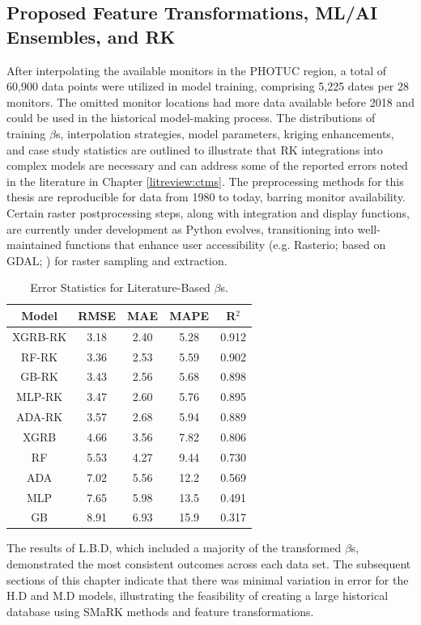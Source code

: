 \subsection{Proposed Feature Transformations, ML/AI Ensembles, and RK} \label{rlts:featsmark} After interpolating the available monitors in the PHOTUC region, a total of 60,900 data points were utilized in model training, comprising 5,225 dates per 28 monitors. The omitted monitor locations had more data available before 2018 and could be used in the historical model-making process. The distributions of training $\beta$s, interpolation strategies, model parameters, kriging enhancements, and case study statistics are outlined to illustrate that RK integrations into complex models are necessary and can address some of the reported errors noted in the literature in Chapter \ref{litreview:ctms}. The preprocessing methods for this thesis are reproducible for data from 1980 to today, barring monitor availability. Certain raster postprocessing steps, along with integration and display functions, are currently under development as Python evolves, transitioning into well-maintained functions that enhance user accessibility (e.g. Rasterio; \cite{gillies_rasterio_2013} based on GDAL; \cite{rouault_gdal_2025}) for raster sampling and extraction. \begin{table}[h!]
    \centering
        \begin{tabular}{||c|cccc||}
            \hline 
            \textbf{Model} & \textbf{RMSE} & \textbf{MAE} & \textbf{MAPE} & \textbf{R$^{2}$} \\
            \hline \hline 
             XGRB-RK & 3.18 & 2.40 &  5.28 & 0.912 \\[3pt]
              RF-RK & 3.36 & 2.53 &  5.59 & 0.902 \\[3pt]
              GB-RK & 3.43 & 2.56 &  5.68 & 0.898 \\[3pt]
             MLP-RK & 3.47 & 2.60 &  5.76 & 0.895 \\[3pt]
             ADA-RK & 3.57 & 2.68 &  5.94 & 0.889 \\[3pt]
               XGRB & 4.66 & 3.56 &  7.82 & 0.806 \\[3pt]
                 RF & 5.53 & 4.27 &  9.44 & 0.730 \\[3pt]
                ADA & 7.02 & 5.56 & 12.2  & 0.569 \\[3pt]
                MLP & 7.65 & 5.98 & 13.5  & 0.491 \\[3pt]
                 GB & 8.91 & 6.93 & 15.9  & 0.317 \\ 
            \hline
        \end{tabular}
    \caption{Error Statistics for Literature-Based $\beta$s.} 
    \label{tab:theoretical_modelerror}
\end{table} The results of L.B.D, which included a majority of the transformed $\beta$s, demonstrated the most consistent outcomes across each data set. The subsequent sections of this chapter indicate that there was minimal variation in error for the H.D and M.D models, illustrating the feasibility of creating a large historical database using SMaRK methods and feature transformations. 

